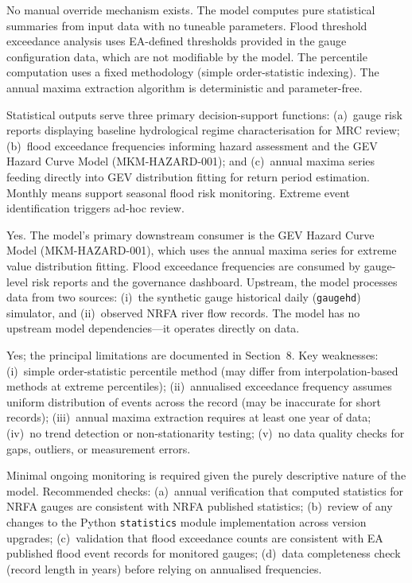 \documentclass[11pt,a4paper]{article}
\begin{document}
No manual override mechanism exists. The model computes pure statistical summaries from input data with no tuneable parameters. Flood threshold exceedance analysis uses EA-defined thresholds provided in the gauge configuration data, which are not modifiable by the model. The percentile computation uses a fixed methodology (simple order-statistic indexing). The annual maxima extraction algorithm is deterministic and parameter-free.

Statistical outputs serve three primary decision-support functions: (a)~gauge risk reports displaying baseline hydrological regime characterisation for MRC review; (b)~flood exceedance frequencies informing hazard assessment and the GEV Hazard Curve Model (MKM-HAZARD-001); and (c)~annual maxima series feeding directly into GEV distribution fitting for return period estimation. Monthly means support seasonal flood risk monitoring. Extreme event identification triggers ad-hoc review.

Yes. The model's primary downstream consumer is the GEV Hazard Curve Model (MKM-HAZARD-001), which uses the annual maxima series for extreme value distribution fitting. Flood exceedance frequencies are consumed by gauge-level risk reports and the governance dashboard. Upstream, the model processes data from two sources: (i)~the synthetic gauge historical daily (\texttt{gaugehd}) simulator, and (ii)~observed NRFA river flow records. The model has no upstream model dependencies---it operates directly on data.

Yes; the principal limitations are documented in Section~8. Key weaknesses: (i)~simple order-statistic percentile method (may differ from interpolation-based methods at extreme percentiles); (ii)~annualised exceedance frequency assumes uniform distribution of events across the record (may be inaccurate for short records); (iii)~annual maxima extraction requires at least one year of data; (iv)~no trend detection or non-stationarity testing; (v)~no data quality checks for gaps, outliers, or measurement errors.

Minimal ongoing monitoring is required given the purely descriptive nature of the model. Recommended checks: (a)~annual verification that computed statistics for NRFA gauges are consistent with NRFA published statistics; (b)~review of any changes to the Python \texttt{statistics} module implementation across version upgrades; (c)~validation that flood exceedance counts are consistent with EA published flood event records for monitored gauges; (d)~data completeness check (record length in years) before relying on annualised frequencies.
\end{document}
